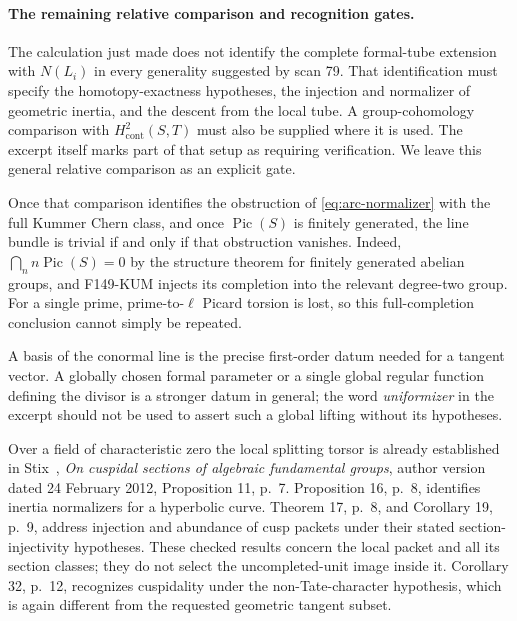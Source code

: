 \documentclass[11pt,a4paper]{article}
\theoremstyle{definition}
\begin{document}
\paragraph{The remaining relative comparison and recognition gates.}
The calculation just made does not identify the complete formal-tube
extension with \(N(L_i)\) in every generality suggested by scan 79.
That identification must specify the homotopy-exactness hypotheses,
the injection and normalizer of geometric inertia, and the descent
from the local tube.  A group-cohomology comparison with
\(H^2_{\mathrm{cont}}(S,T)\) must also be supplied where it is used.
The excerpt itself marks part of that setup as requiring verification.
We leave this general relative comparison as an explicit gate.

Once that comparison identifies the obstruction of
\eqref{eq:arc-normalizer} with the full Kummer Chern class, and once
\(\operatorname{Pic}(S)\) is finitely generated, the line bundle is
trivial if and only if that obstruction vanishes.  Indeed,
\(\bigcap_n n\operatorname{Pic}(S)=0\) by the structure theorem for
finitely generated abelian groups, and F149-KUM injects its completion
into the relevant degree-two group.  For a single prime, prime-to-\(\ell\)
Picard torsion is lost, so this full-completion conclusion cannot
simply be repeated.

A basis of the conormal line is the precise first-order datum needed
for a tangent vector.  A globally chosen formal parameter or a single
global regular function defining the divisor is a stronger datum in
general; the word \emph{uniformizer} in the excerpt should not be used
to assert such a global lifting without its hypotheses.

Over a field of characteristic zero the local splitting torsor is
already established in Stix~\cite{StixCuspidal2012}, \emph{On cuspidal sections of algebraic
fundamental groups}, author version dated 24 February 2012,
Proposition 11, p.~7.  Proposition 16, p.~8, identifies inertia
normalizers for a hyperbolic curve.  Theorem 17, p.~8, and Corollary 19,
p.~9, address injection and abundance of cusp packets under their
stated section-injectivity hypotheses.  These checked results concern
the local packet and all its section classes; they do not select the
uncompleted-unit image inside it.  Corollary 32, p.~12, recognizes
cuspidality under the non-Tate-character hypothesis, which is again
different from the requested geometric tangent subset.
\end{document}
